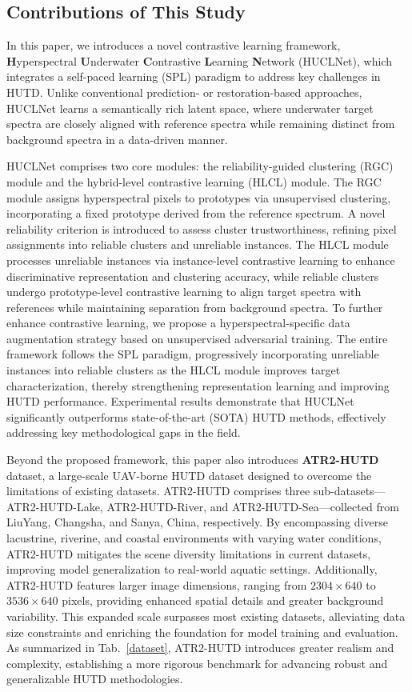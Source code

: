 \subsection{Contributions of This Study}  
In this paper, we introduces a novel contrastive learning framework, \textbf{H}yperspectral \textbf{U}nderwater \textbf{C}ontrastive \textbf{L}earning \textbf{N}etwork (HUCLNet), which integrates a self-paced learning (SPL) paradigm to address key challenges in HUTD.  
Unlike conventional prediction- or restoration-based approaches, HUCLNet learns a semantically rich latent space, where underwater target spectra are closely aligned with reference spectra while remaining distinct from background spectra in a data-driven manner.  
\par
HUCLNet comprises two core modules: the reliability-guided clustering (RGC) module and the hybrid-level contrastive learning (HLCL) module.  
The RGC module assigns hyperspectral pixels to prototypes via unsupervised clustering, incorporating a fixed prototype derived from the reference spectrum.  
A novel reliability criterion is introduced to assess cluster trustworthiness, refining pixel assignments into reliable clusters and unreliable instances.  
The HLCL module processes unreliable instances via instance-level contrastive learning to enhance discriminative representation and clustering accuracy, while reliable clusters undergo prototype-level contrastive learning to align target spectra with references while maintaining separation from background spectra.  
To further enhance contrastive learning, we propose a hyperspectral-specific data augmentation strategy based on unsupervised adversarial training.  
The entire framework follows the SPL paradigm, progressively incorporating unreliable instances into reliable clusters as the HLCL module improves target characterization, thereby strengthening representation learning and improving HUTD performance.  
Experimental results demonstrate that HUCLNet significantly outperforms state-of-the-art (SOTA) HUTD methods, effectively addressing key methodological gaps in the field.  
\par
Beyond the proposed framework, this paper also introduces \textbf{ATR2-HUTD} dataset, a large-scale UAV-borne HUTD dataset designed to overcome the limitations of existing datasets.  
ATR2-HUTD comprises three sub-datasets—ATR2-HUTD-Lake, ATR2-HUTD-River, and ATR2-HUTD-Sea—collected from LiuYang, Changsha, and Sanya, China, respectively.  
By encompassing diverse lacustrine, riverine, and coastal environments with varying water conditions, ATR2-HUTD mitigates the scene diversity limitations in current datasets, improving model generalization to real-world aquatic settings.  
Additionally, ATR2-HUTD features larger image dimensions, ranging from $2304 \times 640$ to $3536 \times 640$ pixels, providing enhanced spatial details and greater background variability.  
This expanded scale surpasses most existing datasets, alleviating data size constraints and enriching the foundation for model training and evaluation.  
As summarized in Tab.~\ref{dataset}, ATR2-HUTD introduces greater realism and complexity, establishing a more rigorous benchmark for advancing robust and generalizable HUTD methodologies.  
\par

